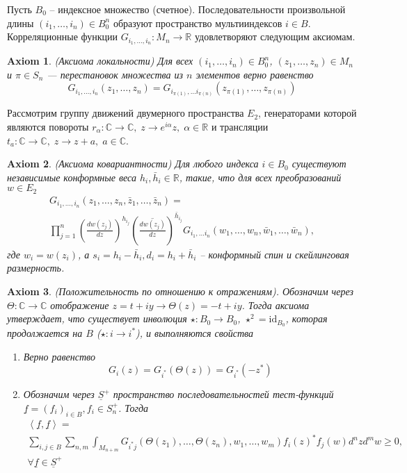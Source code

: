 \documentclass[12pt]{article}
\newtheorem{axiom}{Axiom}
\begin{document}
Пусть $B_{0}$ -- индексное множество (счетное). Последовательности произвольной длины
$(i_{1},\dots,i_{n})\in B_{0}^{n}$ образуют пространство мультииндексов $i\in B$. Корреляционные
функции $G_{i_{1},\dots, i_{n}}:M_{n}\to \mathbb{R}$ удовлетворяют следующим аксиомам.
\begin{axiom}
  (Аксиома локальности) Для всех $(i_{1},\dots,i_{n})\in B_{0}^{n}$, $(z_{1},\dots, z_{n})\in M_{n}$
  и $\pi\in S_{n}$ --- перестановок множества из $n$ элементов верно равенство
  \begin{equation}
    \label{eq:51}
    G_{i_{1},\dots,i_{n}}(z_{1},\dots,z_{n})=G_{i_{\pi(1)},\dots i_{\pi(n)}}(z_{\pi(1)},\dots, z_{\pi(n)})
  \end{equation}
\end{axiom}
Рассмотрим группу движений двумерного пространства $E_{2}$, генераторами которой являются повороты
$r_{\alpha}:\mathbb{C}\to\mathbb{C}, \; z\to e^{i\alpha}z,\; \alpha\in \mathbb{R}$ и трансляции
$t_{a}:\mathbb{C}\to\mathbb{C},\; z\to z+a,\; a\in\mathbb{C}$.
\begin{axiom}
  (Аксиома ковариантности) Для любого индекса $i\in B_{0}$ существуют независимые конформные веса
  $h_{i},\bar h_{i}\in \mathbb{R}$, такие, что для всех преобразований $w\in E_{2}$
  \begin{multline}
    \label{eq:52}
    G_{i_{1},\dots,i_{n}}(z_{1},\dots,z_{n},\bar z_{1},\dots, \bar z_{n})=\\
    \prod_{j=1}^{n}\left(\frac{dw(z_{j})}{dz}\right)^{h_{i_{j}}}\left(\overline{\frac{dw(z_{j})}{dz}}\right)^{\bar{h}_{i_{j}}}
    G_{i_1,\dots i_n}(w_{1},\dots, w_{n},\bar w_{1},\dots,\bar w_{n}),
  \end{multline}
  где $w_{i}=w(z_{i})$, а $s_{i}=h_{i}-\bar h_{i}, d_{i}=h_{i}+\bar h_{i}$ -- конформный спин и
  скейлинговая размерность.
\end{axiom}
\begin{axiom}
  (Положительность по отношению к отражениям). Обозначим через $\Theta:\mathbb{C}\to\mathbb{C}$
  отображение $z=t+i y\to \Theta(z)= -t+i y$. Тогда аксиома утверждает, что существует инволюция
  $\star:B_{0}\to B_{0}$, $\star^{2}=\mathrm{id}_{B_{0}}$, которая продолжается на $B$ ($\star:i\to
  i^{*}$), и выполняются свойства
  \begin{enumerate}
  \item Верно равенство
    \begin{equation}
      \label{eq:53}
      G_{i}(z)=G_{i^{*}}(\Theta(z))=G_{i^{*}}(-z^{*})
    \end{equation}
  \item Обозначим через $\underline{S}^{+}$ пространство последовательностей тест-функций
    $\underline{f}=(f_{i})_{i\in B}, f_{i}\in S^{+}_{n}$. Тогда
    \begin{multline}
      \label{eq:54}
      \left<\underline{f},\underline{f}\right>=\\
      \sum_{i,j\in B}\sum_{n,m}\int_{M_{n+m}}G_{i^{*} j}(\Theta(z_{1}),\dots ,\Theta(z_{n}),w_{1},\dots,w_{m}) f_{i}(z)^{*}f_{j}(w) d^{n}z d^{m}w 
      \geq 0,\\ \forall \underline{f}\in \underline{S}^{+}
    \end{multline}
  \end{enumerate}
\end{axiom}
\end{document}
